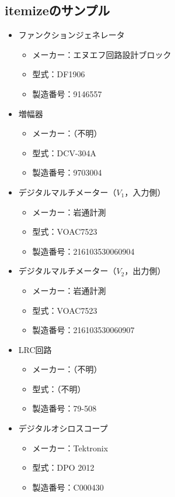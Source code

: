 \subsection{itemizeのサンプル}
\begin{itemize}
\setlength{\itemsep}{2mm}
\item ファンクションジェネレータ
	\begin{itemize}
		\item メーカー：エヌエフ回路設計ブロック
		\item 型式：DF1906
		\item 製造番号：9146557
	\end{itemize}
\item 増幅器
	\begin{itemize}
		\item メーカー：（不明）
		\item 型式：DCV-304A
		\item 製造番号：9703004
	\end{itemize}
\item デジタルマルチメーター（$V_1$，入力側）
	\begin{itemize}
		\item メーカー：岩通計測
		\item 型式：VOAC7523
		\item 製造番号：216103530060904
	\end{itemize}
\item デジタルマルチメーター（$V_2$，出力側）
	\begin{itemize}
		\item メーカー：岩通計測
		\item 型式：VOAC7523
		\item 製造番号：216103530060907
	\end{itemize}
\item LRC回路
	\begin{itemize}
		\item メーカー：（不明）
		\item 型式：（不明）
		\item 製造番号：79-508
	\end{itemize}
\item デジタルオシロスコープ
	\begin{itemize}
		\item メーカー：Tektronix
		\item 型式：DPO 2012
		\item 製造番号：C000430
	\end{itemize}
\end{itemize}
